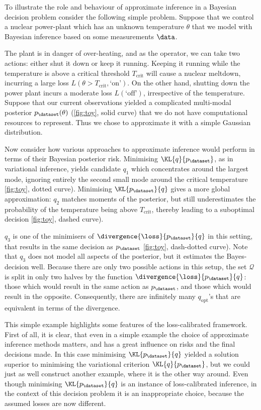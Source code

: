 To illustrate the role and behaviour of approximate inference in a Bayesian decision problem consider the following simple problem. Suppose that we control a nuclear power-plant which has an unknown temperature $\theta$ that we model with Bayesian inference based on some measurements $\data$.

The plant is in danger of over-heating, and as the operator, we can take two actions: either shut it down or keep it running. Keeping it running while the temperature is above a critical threshold $T_\mathrm{crit}$ will cause a nuclear meltdown, incurring a large loss $L(\theta>T_\mathrm{crit},\mbox{`on'})$. On the other hand, shutting down the power plant incurs a moderate loss $L(\mbox{`off'})$, irrespective of the temperature. 
Suppose that our current observations yielded a complicated multi-modal posterior $p_\dataset(\theta)$ (\ref{fig:toy}, solid curve) that we do not have computational resources to represent. Thus we chose to approximate it with a simple Gaussian distribution.

Now consider how various approaches to approximate inference would perform in terms of their Bayesian posterior risk. Minimising $\KL{q}{p_\dataset}$, as in variational inference, yields candidate $q_1$ which concentrates around the largest mode, ignoring entirely the second small mode around the critical temperature \ref{fig:toy}, dotted curve). Minimising $\KL{p_\dataset}{q}$ gives a more global approximation: $q_2$ matches moments of the posterior, but still underestimates the probability of the temperature being above $T_\mathrm{crit}$, thereby leading to a suboptimal decision \ref{fig:toy}, dashed curve).

$q_3$ is one of the minimisers of $\divergence{\loss}{p_\dataset}{q}$ in this setting, that results in the same decision as $p_\dataset$ \ref{fig:toy}, dash-dotted curve). Note that $q_3$ does not model all aspects of the posterior, but it estimates the Bayes-decision well. Because there are only two possible actions in this setup, the set $\mathcal{Q}$ is split in only two halves by the function $\divergence{\loss}{p_\dataset}{q}$: those which would result in the same action as $p_{\dataset}$, and those which would result in the opposite. Consequently, there are infinitely many $q_\mathrm{opt}$'s that are equivalent in terms of the divergence.

This simple example highlights some features of the loss-calibrated framework. First of all, it is clear, that even in a simple example the choice of approximate inference methods matters, and has a great influence on risks and the final decisions made. In this case minimising $\KL{p_\dataset}{q}$ yielded a solution superior to minimising the variational criterion $\KL{q}{p_\dataset}$, but we could just as well construct another example, where it is the other way around. Even though minimising $\KL{p_\dataset}{q}$ is an instance of loss-calibrated inference, in the context of this decision problem it is an inappropriate choice, because the assumed losses are now different.

